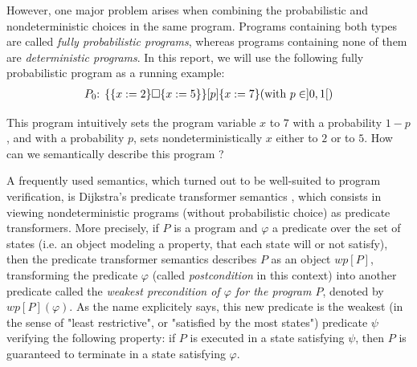 \documentclass[a4paper,10pt]{llncs}
\begin{document}
However, one major problem arises when combining the probabilistic and nondeterministic choices in the same program. Programs containing both types are called \emph{fully probabilistic programs}, whereas programs containing none of them are \emph{deterministic programs}. In this report, we will use the following fully probabilistic program as a running example:
\begin{align*}
 P_0\textnormal{: } \{ \{x := 2\} \square \{x := 5\} \} [p] \{ x := 7 \} \textnormal{(with } p \in ]0,1[\textnormal{)}
\end{align*}

This program intuitively sets the program variable $x$ to $7$ with a probability $1-p$, and with a probability $p$, sets nondeterministically $x$ either to $2$ or to $5$. How can we semantically describe this program ?\bigskip



A frequently used semantics, which turned out to be well-suited to program verification, is Dijkstra's predicate transformer semantics \cite{Dijkstra76}, which consists in viewing nondeterministic programs (without probabilistic choice) as predicate transformers. More precisely, if $P$ is a program and $\varphi$ a predicate over the set of states (i.e. an object modeling a property, that each state will or not satisfy), then the predicate transformer semantics describes $P$ as an object $wp[P]$, transforming the predicate $\varphi$ (called \emph{postcondition} in this context) into another predicate called the \emph{weakest precondition of $\varphi$ for the program $P$}, denoted by $wp[P](\varphi)$. As the name explicitely says, this new predicate is the weakest (in the sense of "least restrictive", or "satisfied by the most states") predicate $\psi$ verifying the following property: if $P$ is executed in a state satisfying $\psi$, then $P$ is guaranteed to terminate in a state satisfying $\varphi$.\newline
\end{document}
